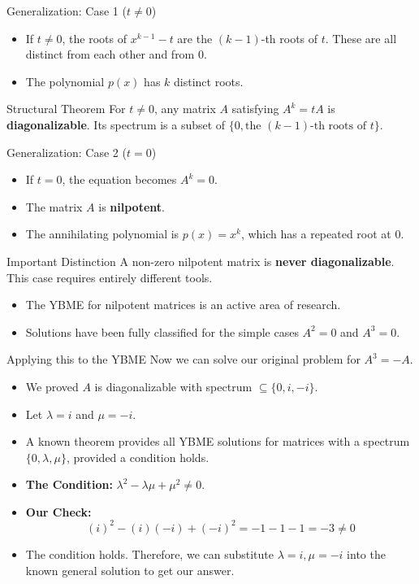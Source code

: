 \documentclass{beamer}
\begin{document}
\begin{frame}{Generalization: Case 1 ($t \neq 0$)}
  \begin{itemize}
    \item If $t \neq 0$, the roots of $x^{k-1} - t$ are the $(k-1)$-th roots of $t$. These are all distinct from each other and from 0.
    \item The polynomial $p(x)$ has $k$ distinct roots.
  \end{itemize}
  \begin{block}{Structural Theorem}
    For $t \neq 0$, any matrix $A$ satisfying $A^k = tA$ is \textbf{diagonalizable}. Its spectrum is a subset of $\{0, \text{the } (k-1)\text{-th roots of } t\}$.
  \end{block}
\end{frame}

\begin{frame}{Generalization: Case 2 ($t = 0$)}
  \begin{itemize}
    \item If $t = 0$, the equation becomes $A^k = 0$.
    \item The matrix $A$ is \textbf{nilpotent}.
    \item The annihilating polynomial is $p(x) = x^k$, which has a repeated root at 0.
  \end{itemize}
  \begin{alertblock}{Important Distinction}
    A non-zero nilpotent matrix is \textbf{never diagonalizable}. This case requires entirely different tools.
  \end{alertblock}
    \vfill
  \begin{itemize}
    \item The YBME for nilpotent matrices is an active area of research.
    \item Solutions have been fully classified for the simple cases $A^2=0$ and $A^3=0$. \cite{nilpotent2, nilpotent3}
  \end{itemize}
\end{frame}

\begin{frame}{Applying this to the YBME}
  Now we can solve our original problem for $A^3 = -A$.
  \begin{itemize}
    \item We proved $A$ is diagonalizable with spectrum $\subseteq \{0, i, -i\}$.
    \item Let $\lambda=i$ and $\mu=-i$.
    \item A known theorem provides all YBME solutions for matrices with a spectrum $\{0, \lambda, \mu\}$, provided a condition holds. \cite{tripotent}
    \pause
    \item \textbf{The Condition:} $\lambda^2 - \lambda\mu + \mu^2 \neq 0$.
    \pause
    \item \textbf{Our Check:}
    \[ (i)^2 - (i)(-i) + (-i)^2 = -1 - 1 - 1 = -3 \neq 0 \]
    \item The condition holds. Therefore, we can substitute $\lambda=i, \mu=-i$ into the known general solution to get our answer.
  \end{itemize}
\end{frame}
\end{document}
